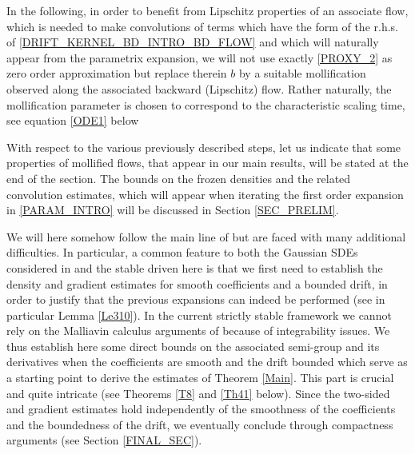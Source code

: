 \documentclass[JEP,XML,SOM,Unicode,published]{cedram}
\theoremstyle{plain}
\theoremstyle{definition}
\newcommand\1{{\mathbf{1}}}
\begin{document}
{In the following, in order to benefit from Lipschitz properties of an associate flow, which is \eg needed to make convolutions of terms which have the form of the r.h.s. of \eqref{DRIFT_KERNEL_BD_INTRO_BD_FLOW} and which will naturally appear from the parametrix expansion, we will not use exactly \eqref{PROXY_2} as zero order approximation but replace therein $b $ by a suitable mollification observed along the associated backward (Lipschitz) flow. Rather naturally, the mollification parameter is chosen to correspond to the characteristic scaling time, see equation \eqref{ODE1} below}

{With respect to the various previously described steps, let us indicate that some properties of mollified flows, that appear in our main results, will be stated at the end of the section. The bounds on the frozen densities and the related convolution estimates, which will appear when iterating the first order expansion in \eqref{PARAM_INTRO} will be discussed in Section \ref{SEC_PRELIM}.}

We will here somehow follow the main line of \cite{meno:pesc:zhan:20} but are faced with many additional difficulties. In particular, a common feature to both the Gaussian SDEs considered in \cite{meno:pesc:zhan:20} and the stable driven here is that we first need to establish the density and gradient estimates for smooth coefficients and a bounded drift, in order to justify that the previous expansions can indeed be performed (see in particular Lemma \ref{Le310}).
In the current strictly stable framework we cannot rely on the Malliavin calculus arguments of \cite{meno:pesc:zhan:20} because of integrability issues.
We thus establish here some direct bounds on the associated semi-group and its derivatives when the coefficients are smooth and {the drift bounded} which serve as a starting point to derive the estimates of Theorem \ref{Main}. This part is crucial and quite intricate (see Theorems {\ref{T8} and} \ref{Th41} below).
Since the two-sided and gradient estimates hold independently of the smoothness of the coefficients and the boundedness of the drift, we eventually conclude through compactness arguments (see Section \ref{FINAL_SEC}).
\end{document}
